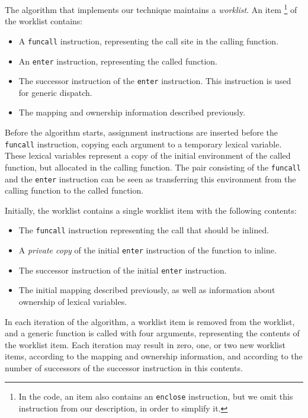 The algorithm that implements our technique maintains a
\emph{worklist}.  An item%
\footnote{In the code, an item also contains an \texttt{enclose}
  instruction, but we omit this instruction from our description, in
  order to simplify it.}
of the worklist contains:

\begin{itemize}
\item A \texttt{funcall} instruction, representing the call site in the
  calling function.
\item An \texttt{enter} instruction, representing the called function.
\item The successor instruction of the \texttt{enter} instruction.
  This instruction is used for generic dispatch.
\item The mapping and ownership information described previously.
\end{itemize}

Before the algorithm starts, assignment instructions are inserted
before the \texttt{funcall} instruction, copying each argument to a
temporary lexical variable.  These lexical variables represent a copy
of the initial environment of the called function, but allocated in
the calling function.  The pair consisting of the \texttt{funcall} and
the \texttt{enter} instruction can be seen as transferring this
environment from the calling function to the called function.

Initially, the worklist contains a single worklist item with the
following contents:

\begin{itemize}
\item The \texttt{funcall} instruction representing the call that
  should be inlined.
\item A \emph{private copy} of the initial \texttt{enter} instruction
  of the function to inline.
\item The successor instruction of the initial \texttt{enter}
  instruction.
\item The initial mapping described previously, as well as
  information about ownership of lexical variables.
\end{itemize}

In each iteration of the algorithm, a worklist item is removed from
the worklist, and a generic function is called with four arguments,
representing the contents of the worklist item.  Each iteration may
result in zero, one, or two new worklist items, according to the
mapping and ownership information, and according to the number of
successors of the successor instruction in this contents.

